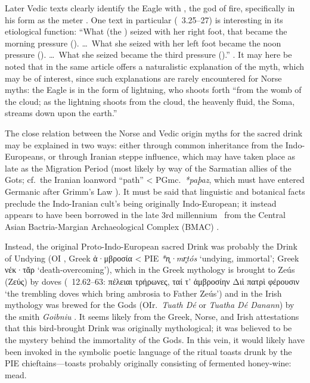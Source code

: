 Later Vedic texts clearly identify the Eagle with , the god of fire, specifically in his form as the  meter \parencite{Bloomfield1896}.  One text in particular (\AitareyaBrahmana\ 3.25--27) is interesting in its etiological function: “What (the ) seized with her right foot, that became the morning pressure (). \dots\ What she seized with her left foot became the noon pressure (). \dots\ What she seized became the third pressure ().” \parencite[6]{Bloomfield1896}.
It may here be noted that \citeauthor{Bloomfield1896} in the same article offers a naturalistic explanation of the myth, which may be of interest, since such explanations are rarely encountered for Norse myths: the Eagle is  in the form of lightning, who shoots forth “from the womb of the cloud; as the lightning shoots from the cloud, the heavenly fluid, the Soma, streams down upon the earth.”

The close relation between the Norse and Vedic origin myths for the sacred drink may be explained in two ways: either through common inheritance from the Indo-Europeans, or through Iranian steppe influence, which may have taken place as late as the Migration Period (most likely by way of the Sarmatian allies of the Gots; cf.~the Iranian loanword “path” < PGmc.~\emph{*paþaz}, which must have entered Germanic after Grimm’s Law \parencite[396]{Kroonen2013}).
It must be said that linguistic and botanical facts preclude the Indo-Iranian  cult’s being originally Indo-European; it instead appears to have been borrowed in the late 3rd millennium \bce\ from the Central Asian Bactria-Margian Archaeological Complex (BMAC) \parencite[3--4, 6]{Lubotsky2001}.

Instead, the original Proto-Indo-European sacred Drink was probably the Drink of Undying (OI , Greek \textgreek{ἀ·μβροσία} < PIE \emph{*n̥·mr̥tós} ‘undying, immortal’; Greek \textgreek{νέκ·τᾰρ} ‘death-overcoming’), which in the Greek mythology is brought to Zeús (\textgreek{Ζεύς}) by doves (\Odyssey\ 12.62--63: \textgreek{πέλειαι τρήρωνες, ταί τ’ ἀμβροσίην Διὶ πατρὶ φέρουσιν} ‘the trembling doves which bring ambrosia to Father Zeús’) and in the Irish mythology was brewed for the Gods (OIr.~\emph{Tuath Dé} or \emph{Tuatha Dé Danann}) by the smith \emph{Goibniu} \parencites[193]{Dobbs1929}[228]{MacKillop1998}.%
It seems likely from the Greek, Norse, and Irish attestations that this bird-brought Drink was originally mythological; it was believed to be the mystery behind the immortality of the Gods.  In this vein, it would likely have been invoked in the symbolic poetic language of the ritual toasts drunk by the PIE chieftains---toasts probably originally consisting of fermented honey-wine: mead.

